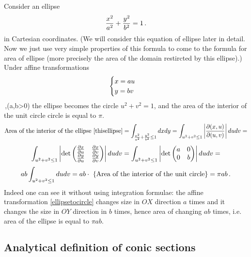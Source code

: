 \documentclass[12pt]{article}
\numberwithin{equation}{section}
\begin{document}
Consider an ellipse 
       \begin{equation}\label{thisellipse}
{x^2\over a^2}+{y^2\over b^2}=1\,.
         \end{equation}
in Cartesian coordinates.
(We will consider this equation
of ellipse later in detail. Now we just 
use very simple
properties of this formula to come to the formula
for area of ellipse (more precisely the area of
the domain restircted by
this ellipse).)
Under  affine transformations
   \begin{equation}\label{ellipsetocircle}
\begin{cases}x=au\cr y=bv\cr\end{cases}
   \end{equation}\,,\quad (a,b>0)
the ellipse becomes the circle $u^2+v^2=1$, and
the area of the interior of the unit circle
circle is equal to $\pi$.
             $$
\hbox {Area of the interior of the 
ellipse \eqref{thisellipse}}=
 \int_{
{x^2\over a^2}+{y^2\over b^2}\leq 1}dxdy=
 \int_{u^2+v^2\leq 1} 
\left|{\partial (x,u)\over \partial (u,v)}\right|dudv=
             $$
    \begin{equation*}
 \int_{u^2+v^2\leq 1} 
\left|\det \begin{pmatrix} 
 {\partial x\over \partial u}&{\partial x\over \partial v}\cr
 {\partial y\over \partial u}& {\partial y\over \partial v}\cr
      \end{pmatrix}    \right|dudv=
 \int_{u^2+v^2\leq 1} 
\left|\det \begin{pmatrix} 
 a&0\cr
 0& b\cr
      \end{pmatrix}    \right|dudv=
      \end{equation*}
       \begin{equation}\label{areaofellipse}
ab  \int_{u^2+v^2\leq 1} 
         dudv=
ab\cdot \hbox{ \{Area of the interior of the 
unit circle\}}=\pi ab\,.   
      \end{equation}
Indeed one can see it without using integration formulae:
the affine transformation \eqref{ellipsetocircle}
changes size in $OX$ direction $a$ times and it changes the
size in  $OY$ direction in $b$ times, hence area of changing 
 $ab$ times, i.e. area of the ellipse is equal to $\pi ab$.



\subsection{Analytical definition of conic sections}
\label{analyticdefinitions}
\end{document}
